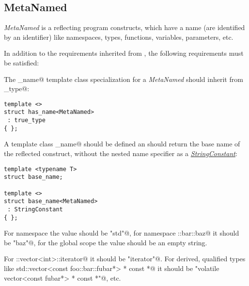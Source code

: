 \subsection{MetaNamed}
\label{concept-MetaNamed}

{\em MetaNamed} is a  reflecting program constructs, which have a name
(are identified by an identifier) like namespaces, types, functions, variables, parameters, etc.

In addition to the requirements inherited from , the following requirements must
be satisfied:

The \verb@has_name@ template class specialization for a {\em MetaNamed} should
inherit from \verb@true_type@:

\begin{lstlisting}
template <>
struct has_name<MetaNamed>
 : true_type
{ };
\end{lstlisting}

A template class \verb@base_name@ should be defined an should return the base name
of the reflected construct, without the nested name specifier as a
\hyperref[concept-StringConstant]{\em StringConstant}:

\begin{lstlisting}
template <typename T>
struct base_name;

template <>
struct base_name<MetaNamed>
 : StringConstant
{ };
\end{lstlisting}

For namespace \verb@std@ the value should be \verb@"std"@, for namespace
\verb@foo::bar::baz@ it should be \verb@"baz"@, for the global scope the
value should be an empty string.

For \verb@std::vector<int>::iterator@ it should be \verb@"iterator"@. For derived,
qualified types like \verb@volatile std::vector<const foo::bar::fubar*> * const *@
it should be \verb@"volatile vector<const fubar*> * const *"@, etc.

